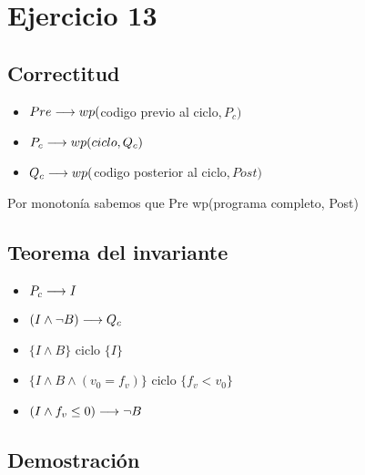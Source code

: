 \documentclass{article}
\begin{document}
\section*{Ejercicio 13}

\subsection*{Correctitud}
\begin{itemize}
    \item $Pre \longrightarrow wp($codigo previo al ciclo$, P_{c})$
    \item $P_{c} \longrightarrow wp(ciclo, Q_{c})$
    \item $Q_{c} \longrightarrow wp($codigo posterior al ciclo$, Post)$
\end{itemize}

Por monotonía sabemos que Pre \implica wp(programa completo, Post)

\subsection*{Teorema del invariante}
\begin{itemize}
    \item $P_{c} \longrightarrow I$
    \item $(I \wedge \neg B) \longrightarrow Q_{c}$
    \item $\{I \wedge B\}$ ciclo $\{ I \}$
    \item $\{I \wedge B \wedge (v_{0} = f_{v})\}$ ciclo $\{f_{v} < v_{0}\}$
    \item $(I \wedge f_{v} \leq 0) \longrightarrow \neg B$
\end{itemize}

\subsection*{Demostración}
\end{document}

